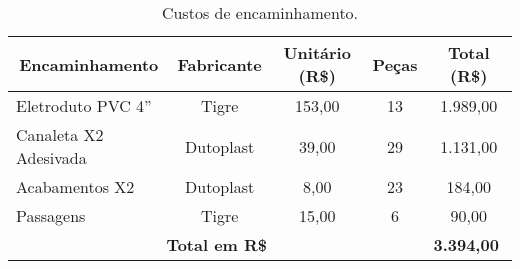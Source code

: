 \begin{table}[h!]
	\begin{center}
		\caption{Custos de encaminhamento.}
		\label{tab11}
		\renewcommand{\arraystretch}{1.2}
\begin{tabular}{|l|c|c|c|c|}
	\hline
	\multicolumn{1}{|c|}{\textbf{Encaminhamento}} & \textbf{Fabricante} & \textbf{Unitário (R\$)} & \textbf{Peças} & \textbf{Total (R\$)}                       \\ \hline
	Eletroduto PVC 4”                             & Tigre               &  153,00              & 13             &  1.989,00                               \\ \hline
	Canaleta X2 Adesivada                         & Dutoplast           &  39,00               & 29             &  1.131,00                               \\ \hline
	Acabamentos X2                                & Dutoplast           &  8,00                & 23             & 184,00                                 \\ \hline
	Passagens                                     & Tigre               & 15,00               & 6              &  90,00                                  \\ \hline
	\multicolumn{4}{|c|}{\textbf{Total em R\$}}                                                                           & \multicolumn{1}{l|}{\textbf{ 3.394,00}} \\ \hline
	
\end{tabular}
\end{center}
\end{table}
